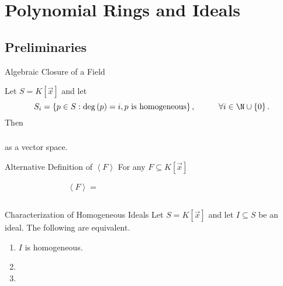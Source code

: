\documentclass[11pt]{article}
\begin{document}
    \section{Polynomial Rings and Ideals}

    \subsection{Preliminaries}

    \begin{theorem}{Algebraic Closure of a Field}
    \end{theorem}

    \rruleline

    \begin{prop}{}
        Let $S=K\left[ \vec{x} \right]$ and let
        \begin{equation*}
            S_i = \left\lbrace p\in S: \deg\left( p \right) = i, \text{$p$ is homogeneous} \right\rbrace, \hspace{1cm}\forall i\in\N\cup\left\lbrace 0 \right\rbrace.
        \end{equation*}
        Then
        \begin{equation*}
            \phantom{S = \bigoplus^{\infty}_{i=0}S_i}
        \end{equation*}
        as a vector space.
    \end{prop}

    \rruleline

    \begin{prop}{Alternative Definition of $\left< F \right>$}
        For any $F\subseteq K\left[ \vec{x} \right]$
        \begin{equation*}
            \left< F \right> = \phantom{\left\lbrace \sum^{n}_{j=1} p_jf_j : n\geq 1, p_j\in K\left[ \vec{x} \right], f_j\in F \right\rbrace}
        \end{equation*}
    \end{prop}

    \rruleline

    \begin{prop}{Characterization of Homogeneous Ideals}
        Let $S = K\left[ \vec{x} \right]$ and let $I\subseteq S$ be an ideal. The following are equivalent.
        \begin{enumerate}
            \item $I$ is homogeneous.
            \item 
            \item 
        \end{enumerate}
    \end{prop}
\end{document}
